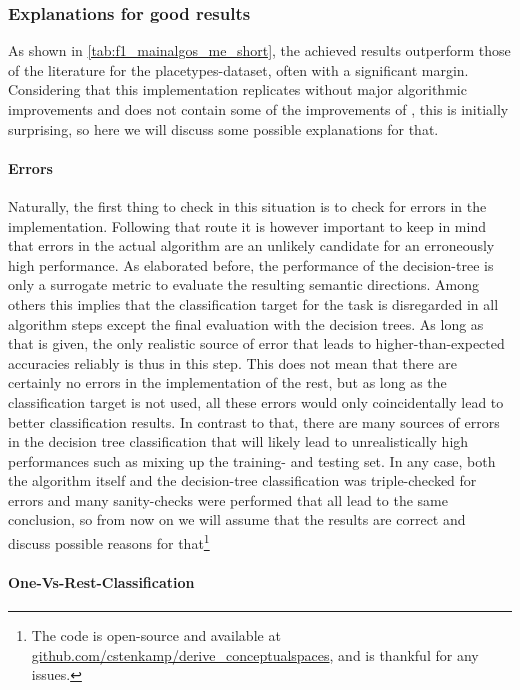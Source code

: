 \subsubsection*{Explanations for good results}


As shown in \autoref{tab:f1_mainalgos_me_short}, the achieved results outperform those of the literature for the placetypes-dataset, often with a significant margin. Considering that this implementation replicates \cite{Derrac2015} without major algorithmic improvements and does not contain some of the improvements of \cite{Ager2018, Alshaikh2020}, this is initially surprising, so here we will discuss some possible explanations for that.

\paragraph{Errors} 
Naturally, the first thing to check in this situation is to check for errors in the implementation. Following that route it is however important to keep in mind that errors in the actual algorithm are an unlikely candidate for an erroneously high performance. As elaborated before, the performance of the decision-tree is only a surrogate metric to evaluate the resulting semantic directions. Among others this implies that the classification target for the task is disregarded in all algorithm steps except the final evaluation with the decision trees. As long as that is given,  the only realistic source of error that leads to higher-than-expected accuracies reliably is thus in this step. This does not mean that there are certainly no errors in the implementation of the rest, but as long as the classification target is not used, all these errors would only coincidentally lead to better classification results. In contrast to that, there are many sources of errors in the decision tree classification that will likely lead to unrealistically high performances such as mixing up the training- and testing set. In any case, both the algorithm itself and the decision-tree classification was triple-checked for errors and many sanity-checks were performed that all lead to the same conclusion, so from now on we will assume that the results are correct and discuss possible reasons for that\footnote{The code is open-source and available at \url{github.com/cstenkamp/derive_conceptualspaces}, and \me is thankful for any issues.}


\paragraph{One-Vs-Rest-Classification}


